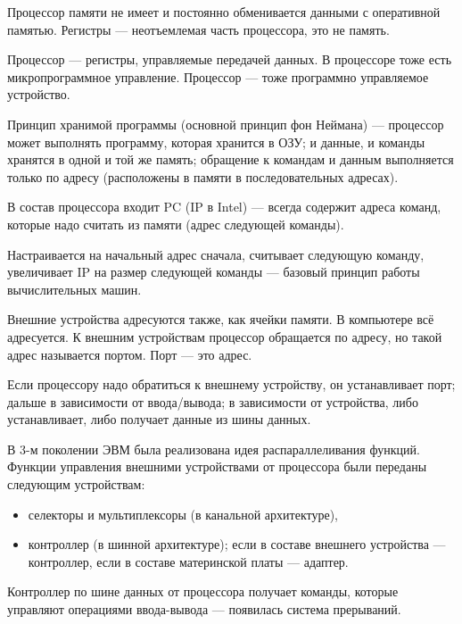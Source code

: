 Процессор памяти не имеет и постоянно обменивается данными с оперативной памятью.
Регистры --- неотъемлемая часть процессора, это не память.

Процессор --- регистры, управляемые передачей данных.
В процессоре тоже есть микропрограммное управление.
Процессор --- тоже программно управляемое устройство.

Принцип хранимой программы (основной принцип фон Неймана) --- процессор может выполнять программу, которая хранится в ОЗУ; и данные, и команды хранятся в одной и той же память; обращение к командам и данным выполняется только по адресу (расположены в памяти в последовательных адресах).

В состав процессора входит PC (IP в Intel) --- всегда содержит адреса команд, которые надо считать из памяти (адрес следующей команды).

Настраивается на начальный адрес сначала, считывает следующую команду, увеличивает IP на размер следующей команды --- базовый принцип работы вычислительных машин.

Внешние устройства адресуются также, как ячейки памяти.
В компьютере всё адресуется.
К внешним устройствам процессор обращается по адресу, но такой адрес называется портом. Порт --- это адрес.

Если процессору надо обратиться к внешнему устройству, он устанавливает порт; дальше в зависимости от ввода/вывода; в зависимости от устройства, либо устанавливает, либо получает данные из шины данных.

В 3-м поколении ЭВМ была реализована идея распараллеливания функций.
Функции управления внешними устройствами от процессора были переданы следующим устройствам:
\begin{itemize}
    \item селекторы и мультиплексоры (в канальной архитектуре),
    \item контроллер (в шинной архитектуре); если в составе внешнего устройства --- контроллер, если в составе материнской платы --- адаптер.
\end{itemize}

Контроллер по шине данных от процессора получает команды, которые управляют операциями ввода-вывода --- появилась система прерываний.

